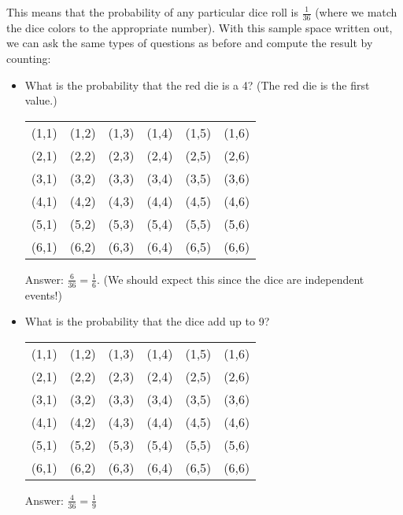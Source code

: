 \documentclass{ximera}
\begin{document}
This means that the probability of any particular dice roll is $\frac{1}{36}$ (where we match the dice colors to the appropriate number). With this sample space written out, we can ask the same types of questions as before and compute the result by counting:
\begin{itemize}
  \item What is the probability that the red die is a 4? (The red die is the first value.)
    \begin{image} \begin{tabular}{cccccc}
      (1,1) & (1,2) & (1,3) & (1,4) & (1,5) & (1,6) \\
      (2,1) & (2,2) & (2,3) & (2,4) & (2,5) & (2,6) \\
      (3,1) & (3,2) & (3,3) & (3,4) & (3,5) & (3,6) \\
      \cellcolor{lightgray}(4,1) & \cellcolor{lightgray}(4,2) & \cellcolor{lightgray}(4,3) & \cellcolor{lightgray}(4,4) & \cellcolor{lightgray}(4,5) & \cellcolor{lightgray}(4,6) \\
      (5,1) & (5,2) & (5,3) & (5,4) & (5,5) & (5,6) \\
      (6,1) & (6,2) & (6,3) & (6,4) & (6,5) & (6,6) \\
    \end{tabular} \end{image}
    Answer: $\frac{6}{36} = \frac{1}{6}$. (We should expect this since the dice are independent events!)
  \item What is the probability that the dice add up to 9?
    \begin{image} \begin{tabular}{cccccc}
      (1,1) & (1,2) & (1,3) & (1,4) & (1,5) & (1,6) \\
      (2,1) & (2,2) & (2,3) & (2,4) & (2,5) & (2,6) \\
      (3,1) & (3,2) & (3,3) & (3,4) & (3,5) & \cellcolor{lightgray}(3,6) \\
      (4,1) & (4,2) & (4,3) & (4,4) & \cellcolor{lightgray}(4,5) & (4,6) \\
      (5,1) & (5,2) & (5,3) & \cellcolor{lightgray}(5,4) & (5,5) & (5,6) \\
      (6,1) & (6,2) & \cellcolor{lightgray}(6,3) & (6,4) & (6,5) & (6,6) \\
    \end{tabular} \end{image}  
    Answer: $\frac{4}{36} = \frac{1}{9}$
\end{itemize}
\end{document}
